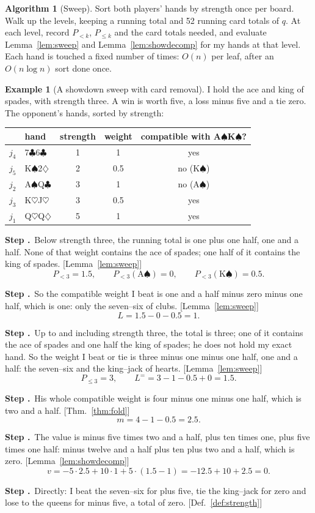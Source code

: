 \documentclass[11pt]{article}
\newcommand{\SP}{\ensuremath{\spadesuit}}\newcommand{\HE}{\ensuremath{\heartsuit}}
\newcommand{\DI}{\ensuremath{\diamondsuit}}\newcommand{\CL}{\ensuremath{\clubsuit}}
\theoremstyle{definition}
\newtheorem{example}[definition]{Example}
\newtheorem{algorithm}[definition]{Algorithm}
\newcounter{stp}
\newcommand{\steps}{\setcounter{stp}{0}}
\newcommand{\st}{\stepcounter{stp}\par\medskip\noindent\textbf{Step \arabic{stp}.}\ }
\newcommand{\by}[1]{\hfill{\small\color{blue!50!black}[#1]}}
\newcommand{\Def}[1]{Def.~\ref{#1}}\newcommand{\Lem}[1]{Lemma~\ref{#1}}\newcommand{\Thm}[1]{Thm.~\ref{#1}}
\begin{document}
\begin{algorithm}[Sweep]\label{alg:sweep}
Sort both players' hands by strength once per board. Walk up the levels, keeping a running total and 52 running card totals
of $q$. At each level, record $P_{<k}$, $P_{\le k}$ and the card totals needed, and evaluate \Lem{lem:sweep} and
\Lem{lem:showdecomp} for my hands at that level. Each hand is touched a fixed number of times: $O(n)$ per leaf, after an
$O(n\log n)$ sort done once.
\end{algorithm}

\begin{example}[A showdown sweep with card removal]\label{ex:sweep}
I hold the ace and king of spades, with strength three. A win is worth five, a loss minus five and a tie zero. The
opponent's hands, sorted by strength:
\begin{center}\begin{tabular}{llccc}
\toprule & hand & strength & weight & compatible with A\SP K\SP?\\ \midrule
$j_4$ & 7\CL 6\CL & 1 & 1 & yes\\
$j_5$ & K\SP 2\DI & 2 & 0.5 & no (K\SP)\\
$j_2$ & A\SP Q\CL & 3 & 1 & no (A\SP)\\
$j_3$ & K\HE J\HE & 3 & 0.5 & yes\\
$j_1$ & Q\HE Q\DI & 5 & 1 & yes\\ \bottomrule
\end{tabular}\end{center}
\steps
\st Below strength three, the running total is one plus one half, one and a half. None of that weight contains the ace of
spades; one half of it contains the king of spades. \by{\Lem{lem:sweep}}
\[ P_{<3}=1.5,\qquad P_{<3}(\text{A}\spadesuit)=0,\qquad P_{<3}(\text{K}\spadesuit)=0.5. \]
\st So the compatible weight I beat is one and a half minus zero minus one half, which is one: only the seven--six of clubs.
\by{\Lem{lem:sweep}}
\[ L=1.5-0-0.5=1. \]
\st Up to and including strength three, the total is three; one of it contains the ace of spades and one half the king of
spades; he does not hold my exact hand. So the weight I beat or tie is three minus one minus one half, one and a half:
the seven--six and the king--jack of hearts. \by{\Lem{lem:sweep}}
\[ P_{\le3}=3,\qquad L^==3-1-0.5+0=1.5. \]
\st His whole compatible weight is four minus one minus one half, which is two and a half. \by{\Thm{thm:fold}}
\[ m=4-1-0.5=2.5. \]
\st The value is minus five times two and a half, plus ten times one, plus five times one half: minus twelve and a half
plus ten plus two and a half, which is zero. \by{\Lem{lem:showdecomp}}
\[ v=-5\cdot2.5+10\cdot1+5\cdot(1.5-1)=-12.5+10+2.5=0. \]
\st Directly: I beat the seven--six for plus five, tie the king--jack for zero and lose to the queens for minus five, a total
of zero. \by{\Def{def:strength}}
\end{example}
\end{document}
